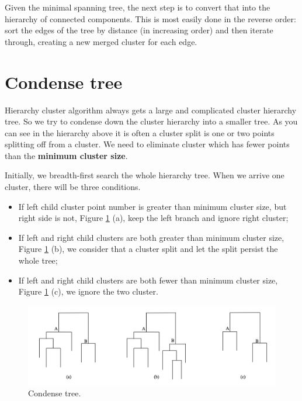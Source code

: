 \documentclass{article}
\begin{document}
Given the minimal spanning tree, the next step is to convert that into the hierarchy of connected components. This is most easily done in the reverse order: sort the edges of the tree by distance (in increasing order) and then iterate through, creating a new merged cluster for each edge. 

\section{Condense tree}

Hierarchy cluster algorithm always gets a large and complicated cluster hierarchy tree. So we try to condense down the cluster hierarchy into a smaller tree. As you can see in the hierarchy above it is often a cluster split is one or two points splitting off from a cluster. We need to eliminate cluster which has fewer points than the \textbf{minimum cluster size}. 

Initially, we breadth-first search the whole hierarchy tree. When we arrive one cluster, there will be three conditions.

\begin{itemize}
	\item If left child cluster point number is greater than minimum cluster size, but right side is not, Figure \ref{fig:condtree} (a), keep the left branch and ignore right cluster;
	\item If left and right child clusters are both greater than minimum cluster size, Figure \ref{fig:condtree} (b), we consider that a cluster split and let the split persist the whole tree;
	\item If left and right child clusters are both fewer than minimum cluster size, Figure \ref{fig:condtree} (c), we ignore the two cluster.
\end{itemize}

\begin{figure}[h!]
	\centering
	\includegraphics[scale=0.45]{b.png}
	\caption{Condense tree.}
	\label{fig:condtree}
\end{figure}
\end{document}
